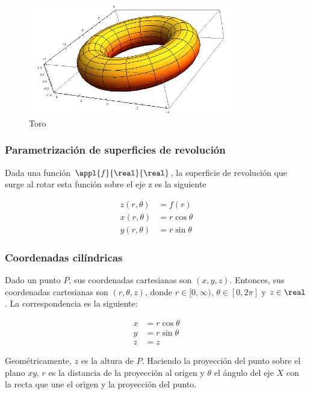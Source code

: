\documentclass[nochap]{apuntes}
\begin{document}
\begin{figure}[hbtp]    
	\begin{center} 
		\includegraphics[width=0.8\textwidth]{img/Toro.png}  
		\caption{Toro} 
	\end{center}  
\end{figure}

\subsubsection{Parametrización de superficies de revolución}

Dada una función $\appl{f}{\real}{\real}$, la superficie de revolución que surge al rotar esta función sobre el eje z es la siguiente

\begin{align*} z(r,\theta) &= f(r) \\
x(r,\theta) &= r \cos \theta \\
y(r,\theta) &= r \sin \theta \end{align*} 

\subsubsection{Coordenadas cilíndricas}
Dado un punto $P$, sus coordenadas cartesianas son $(x,y,z)$. Entonces, sus coordenadas cartesianas son $(r,\theta, z)$, donde $r\in [0,\infty)$, $\theta \in [0,2\pi]$ y $z\in \real$. La correspondencia es la siguiente:

\begin{align*}
x &=r \cos \theta \\
y &= r \sin \theta \\
z &= z
\end{align*}

Geométricamente, $z$ es la altura de $P$. Haciendo la proyección del punto sobre el plano $xy$, $r$ es la distancia de la proyección al origen y $\theta$ el ángulo del eje $X$ con la recta que une el origen y la proyección del punto.
\end{document}
